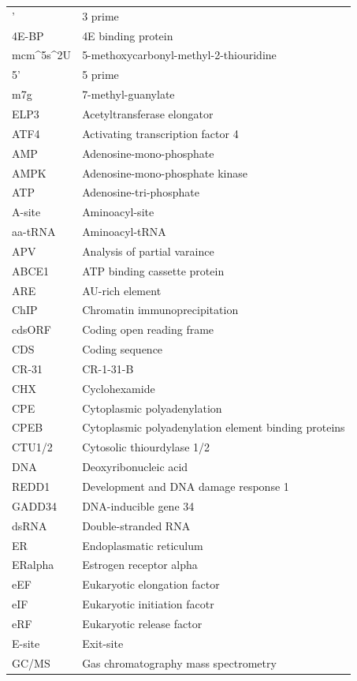 \documentclass[12pt,openany]{book}
\begin{document}
\begin{longtable}{ll}
\endfoot
\bottomrule
\endlastfoot
3' & 3 prime\\
4E-BP & 4E binding protein\\
mcm\textasciicircum{}5s\textasciicircum{}2U & 5-methoxycarbonyl-methyl-2-thiouridine\\
5' & 5 prime\\
m7g & 7-methyl-guanylate\\
\addlinespace
ELP3 & Acetyltransferase elongator\\
ATF4 & Activating transcription factor 4\\
AMP & Adenosine-mono-phosphate\\
AMPK & Adenosine-mono-phosphate
kinase\\
ATP & Adenosine-tri-phosphate\\
\addlinespace
A-site & Aminoacyl-site\\
aa-tRNA & Aminoacyl-tRNA\\
APV & Analysis of partial varaince\\
ABCE1 & ATP binding cassette protein\\
ARE & AU-rich element\\
\addlinespace
ChIP & Chromatin immunoprecipitation\\
cdsORF & Coding open reading frame\\
CDS & Coding sequence\\
CR-31 & CR-1-31-B\\
CHX & Cyclohexamide\\
\addlinespace
CPE & Cytoplasmic polyadenylation\\
CPEB & Cytoplasmic polyadenylation element binding proteins\\
CTU1/2 & Cytosolic thiourdylase 1/2\\
DNA & Deoxyribonucleic acid\\
REDD1 & Development and
DNA damage response 1\\
\addlinespace
GADD34 & DNA-inducible gene 34\\
dsRNA & Double-stranded RNA\\
ER & Endoplasmatic reticulum\\
ERalpha & Estrogen receptor alpha\\
eEF & Eukaryotic elongation factor\\
\addlinespace
eIF & Eukaryotic initiation facotr\\
eRF & Eukaryotic release factor\\
E-site & Exit-site\\
GC/MS & Gas chromatography
mass spectrometry\\

\end{longtable}
\end{document}

